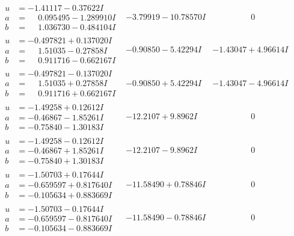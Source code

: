 \documentclass[1p]{elsarticle_modified}
\theoremstyle{definition}
\begin{document}
$$\begin{array}{c|c|c}
\begin{aligned}
u &= -1.41117 - 0.37622 I \\
a &= \phantom{-}0.095495 - 1.289910 I \\
b &= \phantom{-}1.036730 - 0.484104 I\end{aligned}
 & -3.79919 - 10.78570 I & \phantom{-0.000000 } 0 \\ \hline\begin{aligned}
u &= -0.497821 + 0.137020 I \\
a &= \phantom{-}1.51035 - 0.27858 I \\
b &= \phantom{-}0.911716 - 0.662167 I\end{aligned}
 & -0.90850 - 5.42294 I & -1.43047 + 4.96614 I \\ \hline\begin{aligned}
u &= -0.497821 - 0.137020 I \\
a &= \phantom{-}1.51035 + 0.27858 I \\
b &= \phantom{-}0.911716 + 0.662167 I\end{aligned}
 & -0.90850 + 5.42294 I & -1.43047 - 4.96614 I \\ \hline\begin{aligned}
u &= -1.49258 + 0.12612 I \\
a &= -0.46867 - 1.85261 I \\
b &= -0.75840 - 1.30183 I\end{aligned}
 & -12.2107 + 9.8962 I & \phantom{-0.000000 } 0 \\ \hline\begin{aligned}
u &= -1.49258 - 0.12612 I \\
a &= -0.46867 + 1.85261 I \\
b &= -0.75840 + 1.30183 I\end{aligned}
 & -12.2107 - 9.8962 I & \phantom{-0.000000 } 0 \\ \hline\begin{aligned}
u &= -1.50703 + 0.17644 I \\
a &= -0.659597 + 0.817640 I \\
b &= -0.105634 + 0.883669 I\end{aligned}
 & -11.58490 + 0.78846 I & \phantom{-0.000000 } 0 \\ \hline\begin{aligned}
u &= -1.50703 - 0.17644 I \\
a &= -0.659597 - 0.817640 I \\
b &= -0.105634 - 0.883669 I\end{aligned}
 & -11.58490 - 0.78846 I & \phantom{-0.000000 } 0 \\ \hline\begin{aligned}

\end{aligned}
\end{array}$$
\end{document}
